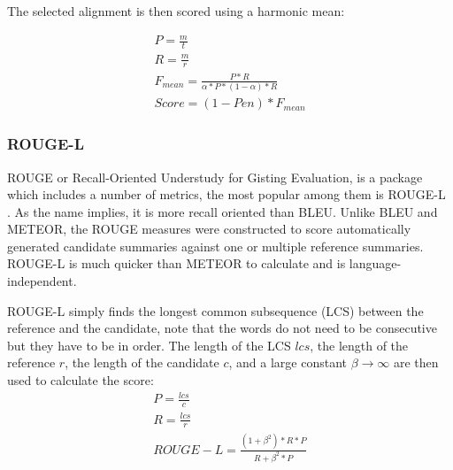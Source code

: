 The selected alignment is then scored using a harmonic mean:

\begin{equation}
  \begin{aligned}
P = \frac{m}{t} \\
R = \frac{m}{r} \\
F_{mean} = \frac{P*R}{\alpha * P * (1 - \alpha) * R} \\
Score = (1 - Pen) * F_{mean}
\end{aligned}
\end{equation}

\subsubsection{ROUGE-L}
ROUGE or Recall-Oriented Understudy for Gisting Evaluation, is a package which includes a number of metrics, the most popular among them is ROUGE-L \cite{Rouge}. As the name implies, it is more recall oriented than BLEU. Unlike BLEU and METEOR, the ROUGE measures were constructed to score automatically generated candidate summaries against one or multiple reference summaries. ROUGE-L is much quicker than METEOR to calculate and is language-independent. 

ROUGE-L simply finds the longest common subsequence (LCS) between the reference and the candidate, note that the words do not need to be consecutive but they have to be in order. The length of the LCS \(lcs\), the length of the reference \(r\), the length of the candidate \(c\), and a large constant \(\beta \rightarrow \infty\) are then used to calculate the score:
\begin{equation}
  \begin{aligned}
P = \frac{lcs}{c} \\
R = \frac{lcs}{r} \\
ROUGE-L= \frac{(1+\beta^2)*R*P}{R+ \beta^2 * P} \\
\end{aligned}
\end{equation}


